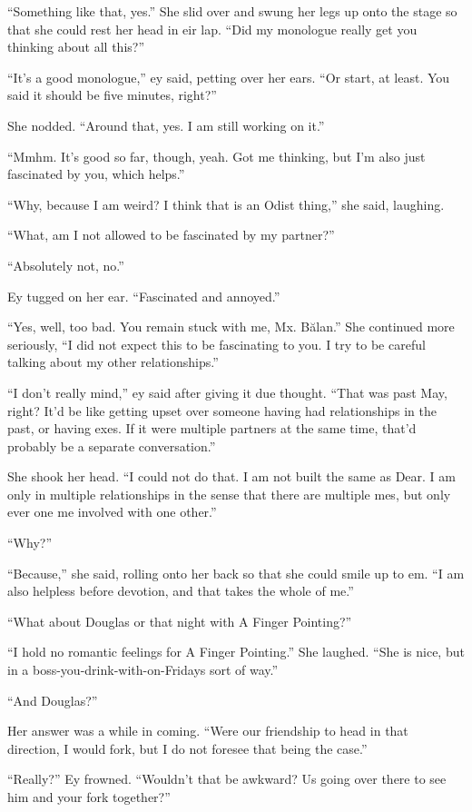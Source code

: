 ``Something like that, yes.'' She slid over and swung her legs up onto the stage so that she could rest her head in eir lap. ``Did my monologue really get you thinking about all this?''

``It's a good monologue,'' ey said, petting over her ears. ``Or start, at least. You said it should be five minutes, right?''

She nodded. ``Around that, yes. I am still working on it.''

``Mmhm. It's good so far, though, yeah. Got me thinking, but I'm also just fascinated by you, which helps.''

``Why, because I am weird? I think that is an Odist thing,'' she said, laughing.

``What, am I not allowed to be fascinated by my partner?''

``Absolutely not, no.''

Ey tugged on her ear. ``Fascinated and annoyed.''

``Yes, well, too bad. You remain stuck with me, Mx. Bălan.'' She continued more seriously, ``I did not expect this to be fascinating to you. I try to be careful talking about my other relationships.''

``I don't really mind,'' ey said after giving it due thought. ``That was past May, right? It'd be like getting upset over someone having had relationships in the past, or having exes. If it were multiple partners at the same time, that'd probably be a separate conversation.''

She shook her head. ``I could not do that. I am not built the same as Dear. I am only in multiple relationships in the sense that there are multiple mes, but only ever one me involved with one other.''

``Why?''

``Because,'' she said, rolling onto her back so that she could smile up to em. ``I am also helpless before devotion, and that takes the whole of me.''

``What about Douglas or that night with A Finger Pointing?''

``I hold no romantic feelings for A Finger Pointing.'' She laughed. ``She is nice, but in a boss-you-drink-with-on-Fridays sort of way.''

``And Douglas?''

Her answer was a while in coming. ``Were our friendship to head in that direction, I would fork, but I do not foresee that being the case.''

``Really?'' Ey frowned. ``Wouldn't that be awkward? Us going over there to see him and your fork together?''

